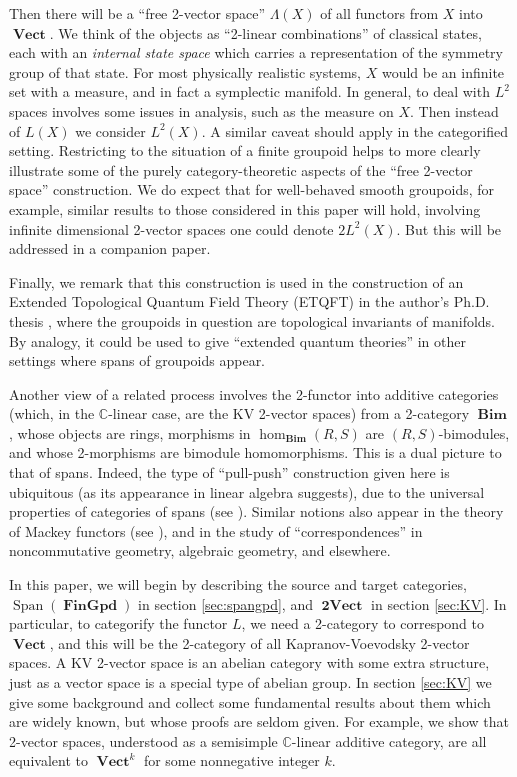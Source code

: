 \documentclass[10pt]{amsart}
\numberwithin{theorem}{subsection}
\newcommand{\opname}[1]{\operatorname{#1}}
\newcommand{\catname}[1]{\boldsymbol{\opname{{#1}}}}
\newcommand{\Span}{\opname{Span}}
\newcommand{\V}{\catname{Vect}}
\newcommand{\iiV}{\catname{2Vect}}
\newcommand{\Gpd}{\catname{FinGpd}}
\newcommand{\FV}{\Lambda}
\begin{document}
Then there will be a ``free 2-vector space'' $\FV(X)$ of all functors
from $X$ into $\V$.  We think of the objects as ``2-linear
combinations'' of classical states, each with an \textit{internal
state space} which carries a representation of the symmetry group of
that state.  For most physically realistic systems, $X$ would be an
infinite set with a measure, and in fact a symplectic manifold.  In
general, to deal with $L^2$ spaces involves some issues in analysis,
such as the measure on $X$.  Then instead of $L(X)$ we consider
$L^2(X)$.  A similar caveat should apply in the categorified setting.
Restricting to the situation of a finite groupoid helps to more
clearly illustrate some of the purely category-theoretic aspects of
the ``free 2-vector space'' construction.  We do expect that for
well-behaved smooth groupoids, for example, similar results to those
considered in this paper will hold, involving infinite dimensional
2-vector spaces one could denote $2L^2(X)$.  But this will be
addressed in a companion paper.

Finally, we remark that this construction is used in the construction
of an Extended Topological Quantum Field Theory (ETQFT) in the
author's Ph.D. thesis \cite{mortonthesis}, where the groupoids in
question are topological invariants of manifolds.  By analogy, it
could be used to give ``extended quantum theories'' in other settings
where spans of groupoids appear.

Another view of a related process involves the 2-functor into additive
categories (which, in the $\mathbb{C}$-linear case, are the KV
2-vector spaces) from a 2-category $\catname{Bim}$, whose objects are
rings, morphisms in $\hom_{\catname{Bim}}(R,S)$ are $(R,S)$-bimodules,
and whose 2-morphisms are bimodule homomorphisms.  This is a dual
picture to that of spans.  Indeed, the type of ``pull-push''
construction given here is ubiquitous (as its appearance in linear
algebra suggests), due to the universal properties of categories of
spans (see \cite{unispan}).  Similar notions also appear in the theory
of Mackey functors (see \cite{elango}), and in the study of
``correspondences'' in noncommutative geometry, algebraic geometry,
and elsewhere.

In this paper, we will begin by describing the source and target
categories, $\Span(\Gpd)$ in section \ref{sec:spangpd}, and $\iiV$ in
section \ref{sec:KV}.  In particular, to categorify the functor $L$,
we need a 2-category to correspond to $\V$, and this will be the
2-category of all Kapranov-Voevodsky 2-vector spaces.  A KV 2-vector
space is an abelian category with some extra structure, just as a
vector space is a special type of abelian group.  In section
\ref{sec:KV} we give some background and collect some fundamental
results about them which are widely known, but whose proofs are seldom
given.  For example, we show that 2-vector spaces, understood as a
semisimple $\mathbb{C}$-linear additive category, are all equivalent
to $\V^k$ for some nonnegative integer $k$.
\end{document}
